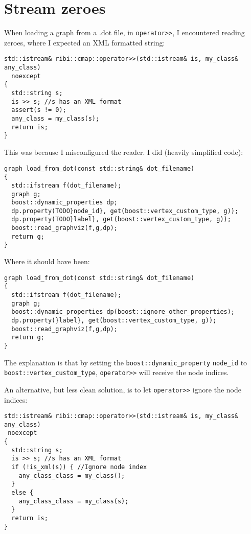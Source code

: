 

\section{Stream zeroes}

When loading a graph from a .dot file, in \verb;operator>>;, 
I encountered reading zeroes, where I expected an XML formatted string:

\begin{verbatim}
std::istream& ribi::cmap::operator>>(std::istream& is, my_class& any_class)
  noexcept
{
  std::string s;
  is >> s; //s has an XML format
  assert(s != 0);
  any_class = my_class(s);
  return is;
}
\end{verbatim}

This was because I misconfigured the reader.
I did (heavily simplified code):

\begin{verbatim}
graph load_from_dot(const std::string& dot_filename)
{
  std::ifstream f(dot_filename);
  graph g;
  boost::dynamic_properties dp;
  dp.property(TODO}node_id}, get(boost::vertex_custom_type, g));
  dp.property(TODO}label}, get(boost::vertex_custom_type, g));
  boost::read_graphviz(f,g,dp);
  return g;
}
\end{verbatim}

Where it should have been:

\begin{verbatim}
graph load_from_dot(const std::string& dot_filename)
{
  std::ifstream f(dot_filename);
  graph g;
  boost::dynamic_properties dp(boost::ignore_other_properties);
  dp.property(}label}, get(boost::vertex_custom_type, g));
  boost::read_graphviz(f,g,dp);
  return g;
}
\end{verbatim}

The explanation is that by setting the 
\verb;boost::dynamic_property; 
\verb;node_id;
to 
\verb;boost::vertex_custom_type;, 
\verb;operator>>; 
will receive the node indices.
 
An alternative, but less clean solution, is to let \verb;operator>>; ignore the
node indices:

\begin{verbatim}
std::istream& ribi::cmap::operator>>(std::istream& is, my_class& any_class)
 noexcept
{
  std::string s;
  is >> s; //s has an XML format
  if (!is_xml(s)) { //Ignore node index
    any_class_class = my_class(); 
  }
  else {
    any_class_class = my_class(s);
  }
  return is;
}
\end{verbatim}


